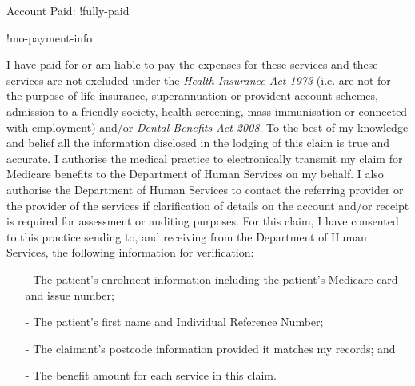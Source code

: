 \documentclass[12pt]{article}
\begin{document}
\vspace{3mm}

Account Paid: !fully-paid

\begin{spacing}{0.3}

\vspace{3mm}
  
  {\footnotesize

    !mo-payment-info} 

 \vspace{3mm}

{\tiny
 
I have paid for or am liable to pay the expenses for these services and these services are not excluded under the \emph{Health Insurance Act 1973} (i.e. are not for the purpose of life insurance, superannuation or provident account schemes, admission to a friendly society, health screening, mass immunisation or connected with employment) and/or \emph{Dental Benefits Act 2008}. To the best of my knowledge and belief all the information disclosed in the lodging of this claim is true and accurate. I authorise the medical practice to electronically transmit my claim for Medicare benefits to the Department of Human Services on my behalf. I also authorise the Department of Human Services to contact the referring provider or the provider of the services if clarification of details on the account and/or receipt is required for assessment or auditing purposes. 
For this claim, I have consented to this practice sending to, and receiving from the Department of Human Services, the following information for verification:

\vspace{1mm}

\begin{itemize}[noitemsep,nolistsep]
  \item[-] The patient’s enrolment information including the patient’s Medicare card and issue number; 
  \item[-] The patient’s first name and Individual Reference Number; 
  \item[-] The claimant’s postcode information provided it matches my records; and 
  \item[-] The benefit amount for each service in this claim.
\end{itemize}

\vspace{1mm}

}
\end{spacing}
\end{document}

